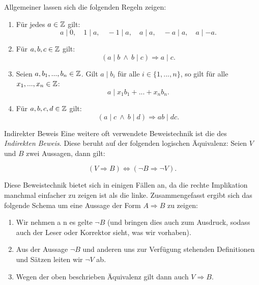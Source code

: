 \begin{frame}
Allgemeiner lassen sich die folgenden Regeln zeigen:

\begin{theorem}
\begin{enumerate}
\item Für jedes $a \in \mathbb{Z}$ gilt:
\[
  a \mid 0, \quad 1 \mid a, \quad -1 \mid a,  \quad a \mid a, \quad -a \mid a,
  \quad a \mid -a .
\]

\item Für $a,b,c \in \mathbb{Z}$ gilt:
\[
  (a \mid b \ \wedge \ b \mid c) \Rightarrow a \mid c .
\]

\item Seien $a,b_1,...,b_n \in \mathbb{Z}$.
Gilt $a \mid b_i$ für alle $i \in \{1,...,n\}$,
so gilt für alle $x_1,...,x_n \in \mathbb{Z}$:
\[
  a \mid x_1 b_1 + ... + x_n b_n .
\]

\item Für $a,b,c,d \in \mathbb{Z}$ gilt:
\[
  (a \mid c \ \wedge  \ b \mid d) \Rightarrow ab \mid dc .
\]
\end{enumerate}
\end{theorem}
\end{frame}


\begin{frame}{Indirekter Beweis}
Eine weitere oft verwendete Beweistechnik ist die des
\textit{Indirekten Beweis}.
Diese beruht auf der folgenden logischen Äquivalenz:
Seien $V$ und $B$ zwei Aussagen, dann gilt:

\[
    (V \Rightarrow B) \iff (\neg B \Rightarrow \neg V).
\]

Diese Beweistechnik bietet sich in einigen Fällen an, da die rechte Implikation
manchmal einfacher zu zeigen ist als die linke.
Zusammengefasst ergibt sich das folgende Schema um eine Aussage der Form
$A \Rightarrow B$ zu zeigen:

\begin{enumerate}
\item Wir nehmen a n es gelte $\neg B$ (und bringen dies auch zum Ausdruck,
sodass auch der Leser oder Korrektor sieht, was wir vorhaben).

\item Aus der Aussage $\neg B$ und anderen uns zur Verfügung stehenden
Definitionen und Sätzen leiten wir $\neg V$ ab.

\item Wegen der oben beschrieben Äquivalenz gilt dann auch $V \Rightarrow B$.
\end{enumerate}
\end{frame}


